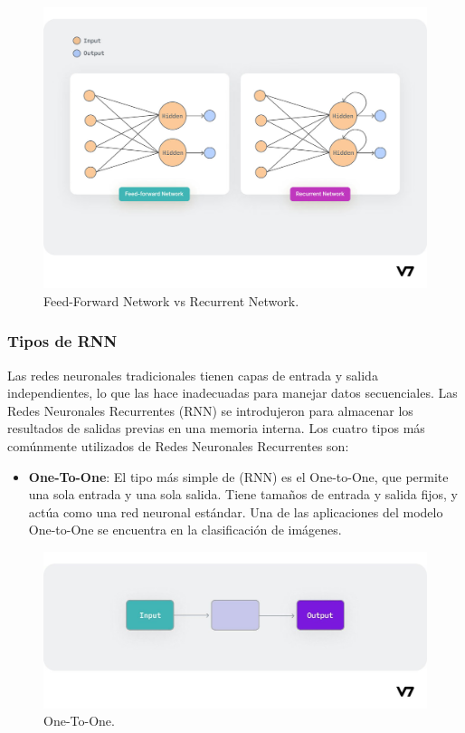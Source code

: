 \documentclass{article}
\begin{document}
\begin{figure}[H]
    \centering
    \includegraphics[scale=0.25]{ffrn.png}
    \caption{Feed-Forward Network vs Recurrent Network.}
\end{figure}

\newpage

\subsubsection{Tipos de RNN}
Las redes neuronales tradicionales tienen capas de entrada y salida independientes, lo que las hace inadecuadas para manejar datos secuenciales.
Las Redes Neuronales Recurrentes (RNN) se introdujeron para almacenar los resultados de salidas previas en una memoria interna.
Los cuatro tipos más comúnmente utilizados de Redes Neuronales Recurrentes son:

\begin{itemize}
    \item \textbf{One-To-One}: El tipo más simple de (RNN) es el One-to-One, que permite una sola entrada y una sola salida. Tiene tamaños de entrada y salida fijos, y actúa como una red neuronal estándar. Una de las aplicaciones del modelo One-to-One se encuentra en la clasificación de imágenes.
\end{itemize}

\begin{figure}[H]
    \centering
    \includegraphics[scale=0.25]{oto.jpeg}
    \caption{One-To-One.}
\end{figure}
\end{document}
